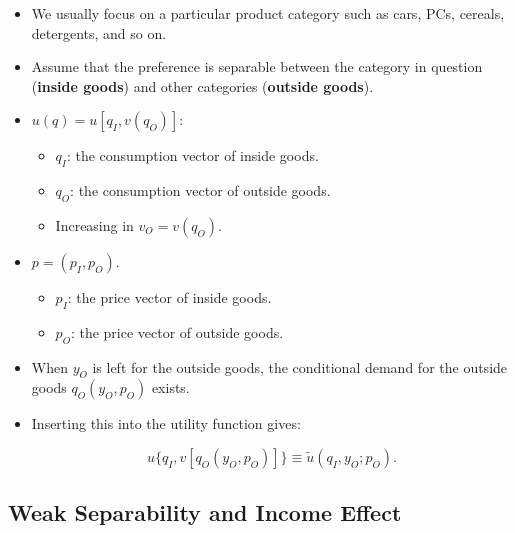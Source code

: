 \documentclass[]{book}
\providecommand{\tightlist}{%
  \setlength{\itemsep}{0pt}\setlength{\parskip}{0pt}}
\begin{document}
\begin{itemize}
\tightlist
\item
  We usually focus on a particular product category such as cars, PCs,
  cereals, detergents, and so on.
\item
  Assume that the preference is separable between the category in
  question (\textbf{inside goods}) and other categories (\textbf{outside
  goods}).
\item
  \(u(q) = u[q_I, v(q_O)]\):

  \begin{itemize}
  \tightlist
  \item
    \(q_I\): the consumption vector of inside goods.
  \item
    \(q_O\): the consumption vector of outside goods.
  \item
    Increasing in \(v_O = v(q_O)\).
  \end{itemize}
\item
  \(p = (p_I, p_O)\).

  \begin{itemize}
  \tightlist
  \item
    \(p_I\): the price vector of inside goods.
  \item
    \(p_O\): the price vector of outside goods.
  \end{itemize}
\item
  When \(y_O\) is left for the outside goods, the conditional demand for
  the outside goods \(q_O(y_O, p_O)\) exists.
\item
  Inserting this into the utility function gives:

  \begin{equation}
  u\{q_I, v[q_O(y_O, p_O)]\} \equiv \tilde{u}(q_I, y_O; p_O).
  \end{equation}
\end{itemize}

\subsection{Weak Separability and Income
Effect}\label{weak-separability-and-income-effect-1}
\end{document}
